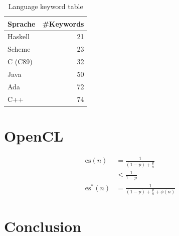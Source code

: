 \documentclass{scrartcl}
\begin{document}
\begin{table}
  \caption{Language keyword table}
  \label{tab:lang}
  \begin{tabular}{lr}
    \toprule
    Sprache  & \#Keywords \\
    \midrule
    Haskell  & 21         \\
    Scheme   & 23         \\
    C (C89)  & 32         \\
    Java     & 50         \\
    Ada      & 72         \\
    C++      & 74         \\
    \bottomrule
  \end{tabular}
\end{table}

\section{OpenCL}

\begin{align}
  \text{es}(n) & = \frac{1}{(1-p) + \frac{p}{n}} \\ & \le \frac{1}{1-p} \\
  \text{es}^{*}(n) & = \frac{1}{(1-p) + \frac{p}{n} + \phi(n)}
\end{align}

\section{Conclusion}

\printbibliography
\end{document}
